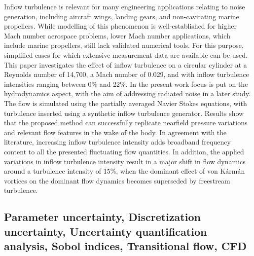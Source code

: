 \documentclass[a4paper,10pt]{article}
\begin{document}
Inflow turbulence is relevant for many engineering applications relating to noise generation, including aircraft wings, landing gears, and non-cavitating marine propellers. While modelling of this phenomenon is well-established for higher Mach number aerospace problems, lower Mach number applications, which include marine propellers, still lack validated numerical tools. For this purpose, simplified cases for which extensive measurement data are available can be used. This paper investigates the effect of inflow turbulence on a circular cylinder at a Reynolds number of 14,700, a Mach number of 0.029, and with inflow turbulence intensities ranging between 0\% and 22\%. In the present work focus is put on the hydrodynamics aspect, with the aim of addressing radiated noise in a later study. The flow is simulated using the partially averaged Navier Stokes equations, with turbulence inserted using a synthetic inflow turbulence generator. Results show that the proposed method can successfully replicate nearfield pressure variations and relevant flow features in the wake of the body. In agreement with the literature, increasing inflow turbulence intensity adds broadband frequency content to all the presented fluctuating flow quantities. In addition, the applied variations in inflow turbulence intensity result in a major shift in flow dynamics around a turbulence intensity of 15\%, when the dominant effect of von Kármán vortices on the dominant flow dynamics becomes superseded by freestream turbulence.

\subsection{Parameter uncertainty, Discretization uncertainty, Uncertainty quantification analysis, Sobol indices, Transitional flow, CFD \cite{Katsuno2021}}
\end{document}
